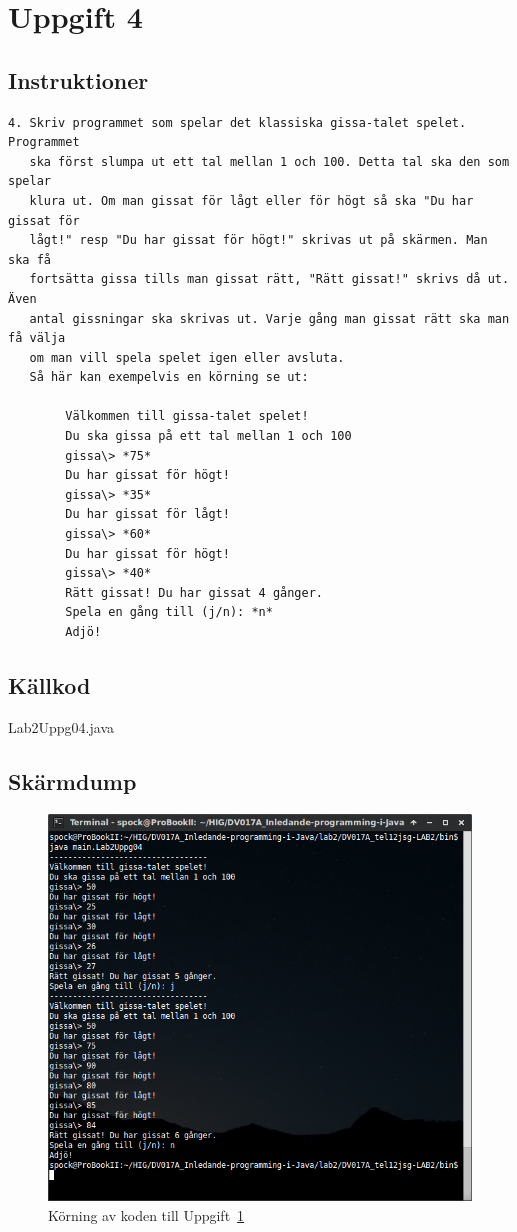 \section{Uppgift 4}\label{sec:uppg04}

\subsection{Instruktioner}
\begin{verbatim}
4. Skriv programmet som spelar det klassiska gissa-talet spelet.  Programmet
   ska först slumpa ut ett tal mellan 1 och 100. Detta tal ska den som spelar
   klura ut. Om man gissat för lågt eller för högt så ska "Du har gissat för
   lågt!" resp "Du har gissat för högt!" skrivas ut på skärmen. Man ska få
   fortsätta gissa tills man gissat rätt, "Rätt gissat!" skrivs då ut. Även
   antal gissningar ska skrivas ut. Varje gång man gissat rätt ska man få välja
   om man vill spela spelet igen eller avsluta.
   Så här kan exempelvis en körning se ut:

        Välkommen till gissa-talet spelet!
        Du ska gissa på ett tal mellan 1 och 100
        gissa\> *75*
        Du har gissat för högt!
        gissa\> *35*
        Du har gissat för lågt!
        gissa\> *60*
        Du har gissat för högt!
        gissa\> *40*
        Rätt gissat! Du har gissat 4 gånger.
        Spela en gång till (j/n): *n*
        Adjö!
\end{verbatim}


\subsection{Källkod}
\caption{Lab2Uppg04.java}
\label{src:uppg04}


\subsection{Skärmdump}
\begin{figure}[htbp]
    \centering
        \includegraphics[width=\linewidth]{img/04.png}
    \caption{Körning av koden till Uppgift~\ref{sec:uppg04}}
    \label{fig:uppg04-screenshot}
\end{figure}

